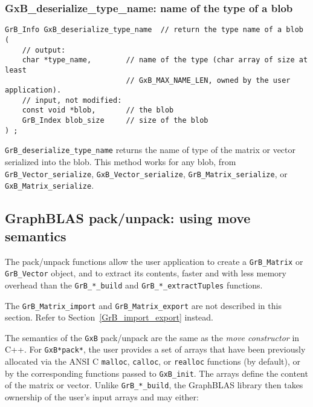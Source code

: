 \documentclass[12pt]{article}
\begin{document}
\subsubsection{{\sf GxB\_deserialize\_type\_name:} name of the type of a blob}
\label{deserialize_type_name}

\begin{mdframed}[userdefinedwidth=6in]
{\footnotesize
\begin{verbatim}
GrB_Info GxB_deserialize_type_name  // return the type name of a blob
(
    // output:
    char *type_name,        // name of the type (char array of size at least
                            // GxB_MAX_NAME_LEN, owned by the user application).
    // input, not modified:
    const void *blob,       // the blob
    GrB_Index blob_size     // size of the blob
) ;
\end{verbatim}
} \end{mdframed}

\verb'GrB_deserialize_type_name' returns the name of type of the matrix or
vector serialized into the blob.  This method works for any blob, from
\verb'GrB_Vector_serialize', \verb'GxB_Vector_serialize',
\verb'GrB_Matrix_serialize', or \verb'GxB_Matrix_serialize'.

\newpage
\subsection{GraphBLAS pack/unpack: using move semantics} %
\label{pack_unpack}

The pack/unpack functions allow the user application to create a
\verb'GrB_Matrix' or \verb'GrB_Vector' object, and to extract its contents,
faster and with less memory overhead than the \verb'GrB_*_build' and
\verb'GrB_*_extractTuples' functions.

The \verb'GrB_Matrix_import' and \verb'GrB_Matrix_export' are not
described in this section.  Refer to Section~\ref{GrB_import_export} instead.

The semantics of the \verb'GxB' pack/unpack are the same as the
{\em move constructor} in C++.  For \verb'GxB*pack*', the user provides a set of
arrays that have been previously allocated via the ANSI C \verb'malloc',
\verb'calloc', or \verb'realloc' functions (by default), or by the
corresponding functions passed to \verb'GxB_init'.  The arrays define the
content of the matrix or vector.  Unlike \verb'GrB_*_build', the GraphBLAS
library then takes ownership of the user's input arrays and may either:
\end{document}
